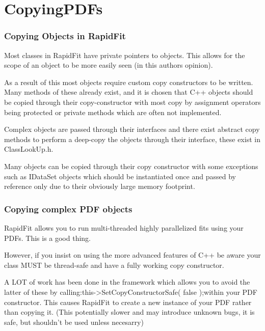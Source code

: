 \documentclass{beamer}
\begin{document}
\section{CopyingPDFs}

\begin{frame}
\frametitle{Copying Objects in RapidFit}
\footnotesize
Most classes in RapidFit have private pointers to objects. This allows for the scope of an object to be more easily seen (in this authors opinion).\newline

As a result of this most objects require custom copy constructors to be written. Many methods of these already exist, and it is chosen that C++ objects should be copied through their copy-constructor with most copy by assignment operators being protected or private methods which are often not implemented.\newline

Complex objects are passed through their interfaces and there exist abstract copy methods to perform a deep-copy the objects through their interface, these exist in \textrm{ClassLookUp.h}.\newline

Many objects can be copied through their copy constructor with some exceptions such as IDataSet objects which should be instantiated once and passed by reference only due to their obviously large memory footprint.

\end{frame}

\begin{frame}
\frametitle{Copying complex PDF objects}
\footnotesize
RapidFit allows you to run multi-threaded highly parallelized fits using your PDFs.
This is a good thing.\newline

However, if you insist on using the more advanced features of C++ be aware your class MUST be thread-safe and have a fully working copy constructor.\newline

A LOT of work has been done in the framework which allows you to avoid the latter of these by calling:\newline \textrm{this->SetCopyConstructorSafe( false );}\newline within your PDF constructor.\newline\newline
This causes RapidFit to create a new instance of your PDF rather than copying it. (This potentially slower and may introduce unknown bugs, it is safe, but shouldn't be used unless necesarry)

\end{frame}
\end{document}
